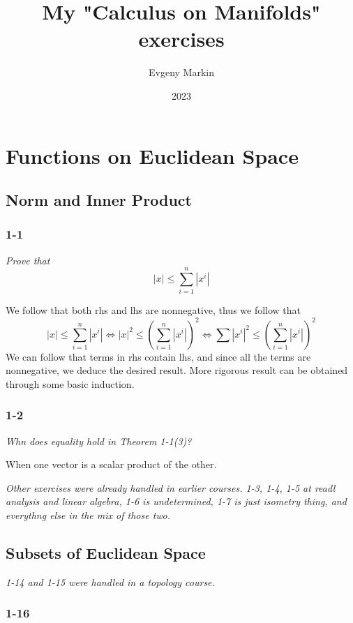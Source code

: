 \documentclass[11pt,oneside,titlepage]{book}
\title{My "Calculus on Manifolds" exercises}
\author{Evgeny Markin}
\date{2023}
\DeclareMathOperator \lra {\Leftrightarrow}
\begin{document}
\maketitle
\tableofcontents

\chapter{Functions on Euclidean Space}

\section{Norm and Inner Product}

\subsection*{1-1}

\textit{Prove that
  $$|x| \leq \sum_{i = 1}^n{|x^i|}$$}

We follow that both rhs and lhs are nonnegative, thus we follow that
$$|x| \leq \sum_{i = 1}^n{|x^i|} \lra |x|^2 \leq \left(\sum_{i = 1}^n{|x^i|}\right)^2
\lra \sum{|x^i|^2} \leq \left(\sum_{i = 1}^n{|x^i|}\right)^2$$
We can follow that terms in rhs contain lhs, and since all the terms are nonnegative, we
deduce the desired result. More rigorous result can be obtained through some basic induction.

\subsection*{1-2}

\textit{Whn does equality hold in Theorem 1-1(3)?}

When one vector is a scalar product of the other.

\textit{Other exercises were already handled in earlier courses. 1-3, 1-4, 1-5 at readl analysis
  and linear algebra, 1-6 is undetermined, 1-7 is just isometry thing, and everythng else in
  the mix of those two.}

\section{Subsets of Euclidean Space}

\textit{1-14 and 1-15 were handled in a topology course.}

\subsection*{1-16}
\end{document}
